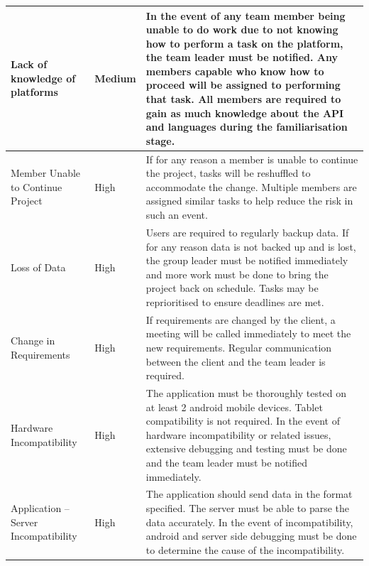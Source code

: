 \documentclass[12pt]{article}
\begin{document}
{\begin{longtable}{|p{2.5cm}|p{1.5cm}|p{10cm}|}
\hline 
	Lack of knowledge of platforms & Medium & In the event of any team member being unable to do work due to not knowing how to perform a task on the platform, the team leader must be notified. Any members capable who know how to proceed will be assigned to performing that task. All members are required to gain as much knowledge about the API and languages during the familiarisation stage. \\
\hline 
	Member Unable to Continue Project & High & If for any reason a member is unable to continue the project, tasks will be reshuffled to accommodate the change. Multiple members are assigned similar tasks to help reduce the risk in such an event. \\
\hline
	Loss of Data & High & Users are required to regularly backup data. If for any reason data is not backed up and is lost, the group leader must be notified immediately and more work must be done to bring the project back on schedule. Tasks may be reprioritised to ensure deadlines are met. \\
\hline 
	Change in Requirements & High & If requirements are changed by the client, a meeting will be called immediately to meet the new requirements. Regular communication between the client and the team leader is required. \\
\hline 
	Hardware Incompatibility & High & The application must be thoroughly tested on at least 2 android mobile devices. Tablet compatibility is not required. In the event of hardware incompatibility or related issues, extensive debugging and testing must be done and the team leader must be notified immediately. \\ 
\hline 
	Application – Server Incompatibility & High & The application should send data in the format specified. The server must be able to parse the data accurately. In the event of incompatibility, android and server side debugging must be done to determine the cause of the incompatibility. \\
\hline
\end{longtable}
\newpage
}
\end{document}
